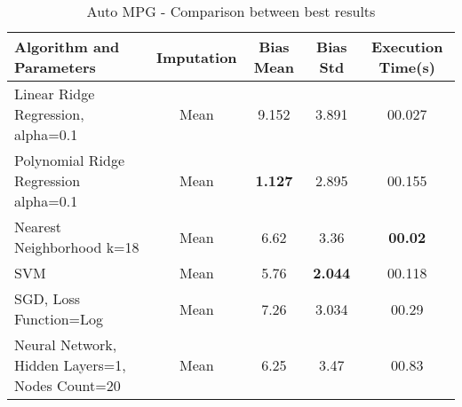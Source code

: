 \begin{center}
\begin{table}
\begin{tabular}{|p{4cm}|c|c|c|c|}
\hline Algorithm and Parameters & Imputation & Bias Mean & Bias Std & Execution Time(s)\\

\hline Linear Ridge Regression, alpha=0.1 & Mean & 9.152 & 3.891 & 00.027 \\

\hline Polynomial Ridge Regression alpha=0.1 & Mean & \textbf{1.127} & 2.895 & 00.155  \\

\hline Nearest Neighborhood k=18 & Mean & 6.62 & 3.36 & \textbf{00.02}  \\

\hline SVM & Mean & 5.76 & \textbf{2.044} & 00.118  \\

\hline SGD, Loss Function=Log & Mean & 7.26 & 3.034 & 00.29  \\

\hline Neural Network, Hidden Layers=1, Nodes Count=20 & Mean & 6.25 & 3.47 & 00.83  \\

\hline
\end{tabular}
    \caption{Auto MPG - Comparison between best results}
    \label{table:db1-results}
    \end{table}
\end{center}
